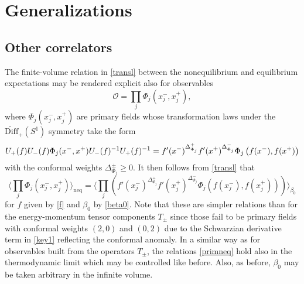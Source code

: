 \documentclass[12pt,a4paper]{article}
\def\nsection#1{\section{#1}\setcounter{equation}{0}}
\newcommand{\SL}{S^1}
\newcommand{\wDiff}{\widetilde{\mathrm{Diff}}}
\newcommand{\cO}{\mathcal{O}}
\theoremstyle{definition}
\theoremstyle{remark}
\begin{document}
\nsection{Generalizations}
\label{sec:4} 


\subsection{Other correlators}
\label{subsec:4.1}

The finite-volume relation in \eqref{transl} between the nonequilibrium and equilibrium expectations may be rendered explicit also for observables
%
\begin{equation}
\cO = \prod_{j} \Phi_j(x^-_j,x^+_j),
\end{equation}  
%
where $\Phi_j(x^-_j,x^+_j)$ are primary fields whose transformation laws under the $\wDiff_+(\SL)$ symmetry take the form
%
\begin{equation}
U_{+}(f)U_{-}(f)\Phi_j(x^-,x^+)U_{-}(f)^{-1}U_{+}(f)^{-1} \\
= f'(x^-)^{\Delta^+_{\Phi_j}} f'(x^+)^{\Delta^-_{\Phi_j}}
	\Phi_j \left( f(x^-),f(x^+) \right)
\end{equation}
%
with the conformal weights $\Delta^\pm_{\Phi_j}\geq0$.
It then follows from \eqref{transl} that
%
\begin{equation}
\label{primneq}  
\Big\langle \prod_{j} \Phi_j(x^-_j,x^+_j) \Big\rangle_{\text{neq}}
= \Big\langle \prod_{j} \left( f'(x_j^-)^{\Delta^+_{\Phi_j}}f'(x_j^+)^{\Delta^-_{\Phi_j}}
	\Phi_j \left( f(x^-_j),f(x^+_j) \right) \right) \Big\rangle_{\beta_0}
\end{equation}
%
for $f$ given by \eqref{f} and $\beta_0$ by \eqref{beta0}.
Note that these are simpler relations than for the energy-momentum tensor components $T_{\pm}$ since those fail to be primary fields with conformal weights $(2,0)$ and $(0,2)$ due to the Schwarzian derivative term in \eqref{key1} reflecting the conformal anomaly.
In a similar way as for observables built from the operators $T_{\pm}$, the relations \eqref{primneq} hold also in the thermodynamic limit which may be controlled like before.
Also, as before, $\beta_0$ may be taken arbitrary in the infinite volume.  
\end{document}
